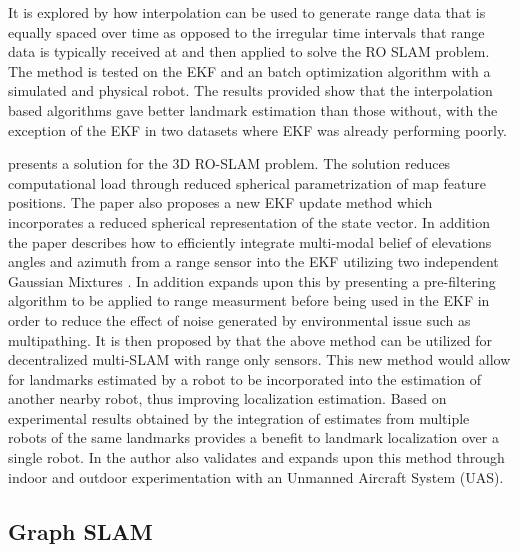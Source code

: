 \documentclass[conference]{IEEEtran}
\begin{document}
It is explored by \cite{Kehagias2006} how interpolation can be used to generate range data that is equally spaced over time as opposed to the irregular time intervals that range data is typically received at and then applied to solve the RO SLAM problem. The method is tested on the EKF and an batch optimization algorithm with a simulated and physical robot. The results provided show that the interpolation based algorithms gave better landmark estimation than those without, with the exception of the EKF in two datasets where EKF was already performing poorly.
	

\cite{Fabresse2013} presents a solution for the 3D RO-SLAM problem. The solution reduces computational load through reduced spherical parametrization of map feature positions. The paper also proposes a new EKF update method which incorporates a reduced spherical representation of the state vector. In addition the paper describes how to efficiently integrate multi-modal belief of elevations angles and azimuth from a range sensor into the EKF utilizing two independent Gaussian Mixtures \cite{Fabresse2013}. In addition \cite{Fabresse2014} expands upon this by presenting a pre-filtering algorithm to be applied to range measurment before being used in the EKF in order to reduce the effect of noise generated by environmental issue such as multipathing. It is then proposed by \cite{Fabresse2015} that the above method can be utilized for decentralized multi-SLAM with range only sensors. This new method would allow for landmarks estimated by a robot to be incorporated into the estimation of another nearby robot, thus improving localization estimation. Based on experimental results obtained by \cite{Fabresse2015} the integration of estimates from multiple robots of the same landmarks provides a benefit to landmark localization over a single robot. In \cite{Fabresse2016} the author also validates and expands upon this method through indoor and outdoor experimentation with an Unmanned Aircraft System (UAS).  


\subsection{Graph SLAM}
\end{document}

